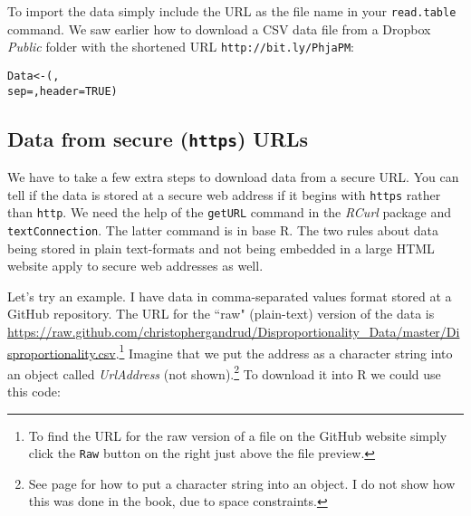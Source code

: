 To import the data simply include the URL as the file name in your \texttt{read.table} command. We saw earlier how to download a CSV data file from a Dropbox \emph{Public} folder with the shortened URL \texttt{http://bit.ly/PhjaPM}:

\begin{knitrout}
\color{fgcolor}\begin{kframe}
\begin{alltt}
Data <- (, 
					sep = , header = TRUE)
\end{alltt}
\end{kframe}
\end{knitrout}


\subsection{Data from secure ({\tt{https}}) URLs}\label{SecureDataDownload}

\noindent We have to take a few extra steps to download data from a secure URL. You can tell if the data is stored at a secure web address if it begins with \texttt{https} rather than \texttt{http}. We need the help of the \texttt{getURL} command in the {\emph{RCurl}} package \cite[]{R-RCurl} and \texttt{textConnection}. The latter command is in base R. The two rules about data being stored in plain text-formats and not being embedded in a large HTML website apply to secure web addresses as well.

Let's try an example. I have data in comma-separated values format stored at a GitHub repository. The URL for the ``raw" (plain-text) version of the data is \url{https://raw.github.com/christophergandrud/Disproportionality_Data/master/Disproportionality.csv}.\footnote{To find the URL for the raw version of a file on the GitHub website simply click the \texttt{Raw} button on the right just above the file preview.} Imagine that we put the address as a character string into an object called \emph{UrlAddress} (not shown).\footnote{See page \pageref{Objects} for how to put a character string into an object. I do not show how this was done in the book, due to space constraints.}
To download it into R we could use this code:




